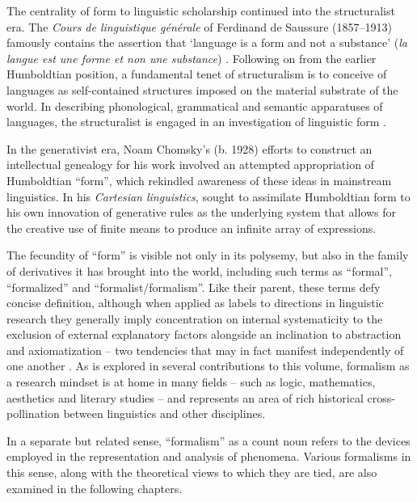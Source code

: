 \begin{refsection}
The centrality of form to linguistic scholarship continued into the structuralist era. The \emph{Cours de linguistique générale} of Ferdinand de Saussure (1857–1913) famously contains the assertion that `language is a form and not a substance' (\emph{la langue est une forme et non une substance}) \citep[169]{Saussure19951916}. Following on from the earlier Humboldtian position, a fundamental tenet of structuralism is to conceive of languages as self-contained structures imposed on the material substrate of the world. In describing phonological, grammatical and semantic apparatuses of languages, the structuralist is engaged in an investigation of linguistic form \citep[for a classical structuralist account couched in these terms, see][54-70]{Lyons1968}.

In the generativist era, Noam Chomsky's (b. 1928) efforts to construct an intellectual genealogy for his work involved an attempted appropriation of Humboldtian ``form'', which  rekindled awareness of these ideas in mainstream linguistics. In his \emph{Cartesian linguistics}, \citet[69-77]{Chomsky20091966} sought to assimilate Humboldtian form to his own innovation of generative rules as the underlying system that allows for the creative use of finite means to produce an infinite array of expressions.

The fecundity of ``form'' is visible not only in its polysemy, but also in the family of derivatives it has brought into the world, including such terms as ``formal'', ``formalized'' and ``formalist/formalism''. Like their parent, these terms defy concise definition, although when applied as labels to directions in linguistic research they generally imply concentration on internal systematicity to the exclusion of external explanatory factors alongside an inclination to abstraction and axiomatization – two tendencies that may in fact manifest independently of one another \citep[cf.][]{Newmeyer1998}. As is explored in several contributions to this volume, formalism as a research mindset is at home in many fields – such as logic, mathematics, aesthetics and literary studies – and represents an area of rich historical cross-pollination between linguistics and other disciplines. 

In a separate but related sense, ``formalism'' as a count noun refers to the devices employed in the representation and analysis of phenomena. Various formalisms in this sense, along with the theoretical views to which they are tied, are also examined in the following chapters.


\end{refsection}
